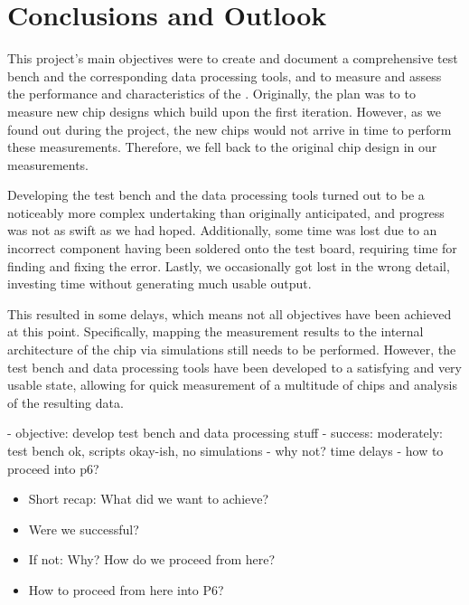 \chapter{Conclusions and Outlook}
\label{chap:conclusions}

This project's  main objectives  were to create  and document  a comprehensive
test bench  and the corresponding  data processing  tools, and to  measure and
assess  the performance  and  characteristics of  the  \sdm.  Originally,  the
plan  was  to  to  measure  new  chip  designs  which  build  upon  the  first
iteration. However, as  we found out during  the project, the new  chips would
not arrive in  time to perform these measurements. Therefore, we  fell back to
the original chip design in our measurements.

Developing the  test bench and  the data processing tools  turned out to  be a
noticeably more complex undertaking  than originally anticipated, and progress
was not as swift  as we had hoped. Additionally, some time was  lost due to an
incorrect component having  been soldered onto the test  board, requiring time
for finding  and fixing  the error. Lastly,  we occasionally  got lost  in the
wrong detail, investing time without generating much usable output.

This  resulted in  some  delays,  which means  not  all  objectives have  been
achieved  at  this point. Specifically,  mapping  the  measurement results  to
the  internal architecture  of  the chip  via simulations  still  needs to  be
performed. However,  the  test  bench  and data  processing  tools  have  been
developed  to  a  satisfying  and   very  usable  state,  allowing  for  quick
measurement of a multitude of chips and analysis of the resulting data.



- objective: develop test bench and data processing stuff
- success: moderately: test bench ok, scripts okay-ish, no simulations
- why not? time delays
- how to proceed into p6?


\begin{itemize}\tightlist
    \item
        Short recap: What did we want to achieve?
    \item
        Were we successful?
    \item
        If not: Why? How do we proceed from here?
    \item
        How to proceed from here into P6?
\end{itemize}
